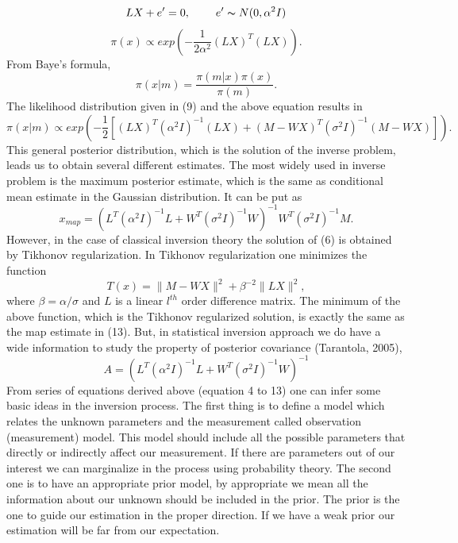 \documentclass[12pt,A4]{article}
\begin{document}
\begin{equation*}
LX+e'=0,\hspace{0.8cm}e'\thicksim N(0,\alpha^{2} I)
\end{equation*}
\begin{equation}
\pi(x)\propto exp\left(-\frac{1}{2\alpha^{2}}(LX)^{T}(LX)\right). 
\end{equation}
From Baye's formula,
\begin{equation}
\pi(x|m)=\frac{\pi(m|x)\pi(x)}{\pi(m)}.
\end{equation}
The likelihood distribution given in (9) and the above equation results in
\begin{equation}
\pi(x|m)\propto exp\left(-\frac{1}{2}\left[(LX)^{T}(\alpha^{2} I)^{-1}(LX)+( M-WX)^{T}(\sigma^2 I)^{-1} (M-WX)\right]\right).
\end{equation}
This general posterior distribution, which is the solution of the inverse problem, leads us to obtain several different estimates. The most widely used in inverse problem is the maximum posterior estimate, which is the same as conditional mean estimate in the Gaussian distribution. It can be put as
\begin{equation}
x_{map}= \left(L^{T}(\alpha^{2} I)^{-1}L+W^{T}(\sigma^2 I)^{-1} W\right)^{-1}W^{T}(\sigma^2 I)^{-1}M.
\end{equation}
However, in the case of classical inversion theory the solution of (6) is obtained by Tikhonov regularization. In Tikhonov regularization one minimizes the function
\begin{equation}
T(x)=\parallel M-WX\parallel ^2+ \beta^{-2}\parallel LX\parallel ^2,
\end{equation}
where $\beta=\alpha/\sigma$ and $L$ is a linear $l^{th}$ order difference matrix. The minimum of the above function, which is the Tikhonov regularized solution, is exactly the same as the map estimate in (13). But, in statistical inversion approach we do have a wide information to study the property of posterior covariance (Tarantola, 2005),
\begin{equation}
A= \left(L^{T}(\alpha^{2} I)^{-1}L+W^{T}(\sigma^2 I)^{-1} W\right)^{-1}
\end{equation}
From series of equations derived above (equation 4 to 13) one can infer some basic ideas in the inversion process. The first thing is to define a model which relates the unknown parameters and the measurement called observation (measurement) model. This model should include all the possible parameters that directly or indirectly affect our measurement. If there are parameters out of our interest we can marginalize in the process using probability theory. The second one is to have an appropriate prior model, by appropriate we mean all the information about our unknown should be included in the prior. The prior is the one to guide our estimation in the proper direction. If we have a weak prior our estimation will be far from our expectation. \\\\
\end{document}
